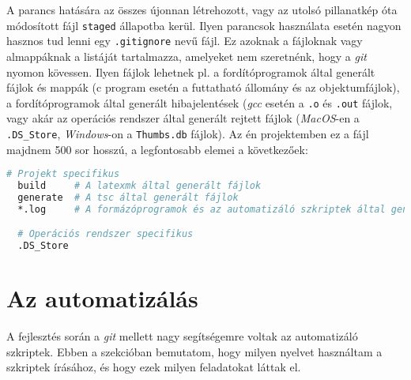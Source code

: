 A parancs hatására az összes újonnan létrehozott, vagy az utolsó pillanatkép
óta módosított fájl \texttt{staged} állapotba kerül. Ilyen parancsok
használata esetén nagyon hasznos tud lenni egy \texttt{.gitignore} nevű fájl.
Ez azoknak a fájloknak vagy almappáknak a listáját tartalmazza, amelyeket nem
szeretnénk, hogy a \textit{git} nyomon kövessen. Ilyen fájlok lehetnek pl. a
fordítóprogramok által generált fájlok és mappák (c program esetén a futtatható
állomány és az objektumfájlok), a fordítóprogramok által generált hibajelentések
(\textit{gcc} esetén a \texttt{.o} és \texttt{.out} fájlok, vagy akár az
operációs rendszer által generált rejtett fájlok (\textit{MacOS}-en a
\texttt{.DS\_Store},  \textit{Windows}-on a \texttt{Thumbs.db} fájlok).
Az én projektemben ez a fájl majdnem 500 sor hosszú, a legfontosabb elemei
a következőek:
\begin{lstlisting}[caption={A projektemben található \texttt{.gitignore} fájl legfontosabb részei},language=sh]
  # Projekt specifikus
  build     # A latexmk által generált fájlok
  generate  # A tsc által generált fájlok
  *.log     # A formázóprogramok és az automatizáló szkriptek által generált fájlok

  # Operációs rendszer specifikus
  .DS_Store
\end{lstlisting}



\section{Az automatizálás}

A fejlesztés során a \textit{git} mellett nagy segítségemre voltak az
automatizáló szkriptek. Ebben a szekcióban bemutatom, hogy milyen nyelvet
használtam a szkriptek írásához, és hogy ezek milyen feladatokat láttak el.


